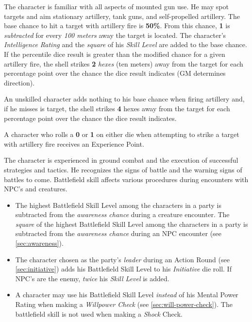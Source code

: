 \label{sec:skill-artillery}

The character is familiar with all aspects of mounted gun use.  He may
spot targets and aim stationary artillery, tank guns, and
self-propelled artillery.  The base chance to hit a target with
artillery fire is \textbf{50\%}.  From this chance, \textbf{1} is
\emph{subtracted} for every \emph{100 meters} away the target is
located.  The character's \emph{Intelligence Rating} and the
\emph{square} of his \emph{Skill Level} are added to the base chance.
If the percentile dice result is greater than the modified chance for
a given artillery fire, the shell strikes \textbf{2} \emph{hexes} (ten
meters) away from the target for each percentage point over the chance
the dice result indicates (GM determines direction).

An unskilled character adds nothing to his base chance when firing
artillery and, if he misses is target, the shell strikes \textbf{4}
hexes away from the target for each percentage point over the chance
the dice result indicates.

A character who rolls a \textbf{0} or \textbf{1} on either die when
attempting to strike a target with artillery fire receives an
Experience Point.

\label{sec:skill-battlefield}

The character is experienced in ground combat and the execution of
successful strategies and tactics.  He recognizes the signs of battle
and the warning signs of battles to come.  Battlefield skill affects
various procedures during encounters with NPC's and creatures.

\begin{itemize}
\item The highest Battlefield Skill Level among the characters in a
  party is subtracted from the \emph{awareness chance} during a
  creature encounter.  The \emph{square} of the highest Battlefield
  Skill Level among the characters in a party is subtracted from the
  \emph{awareness chance} during an NPC encounter (see
  \ref{sec:awareness}).
\item The character chosen as the party's \emph{leader} during an
  Action Round (see \ref{sec:initiative}) adds his Battlefield Skill
  Level to his \emph{Initiative} die roll.  If NPC's are the enemy,
  \emph{twice} his \emph{Skill Level} is added.
\item A character may use his Battlefield Skill Level \emph{instead}
  of his Mental Power Rating when making a \emph{Willpower Check} (see
  \ref{sec:will-power-check}).  The battlefield skill is not used when
  making a \emph{Shock} Check.
\end{itemize}

